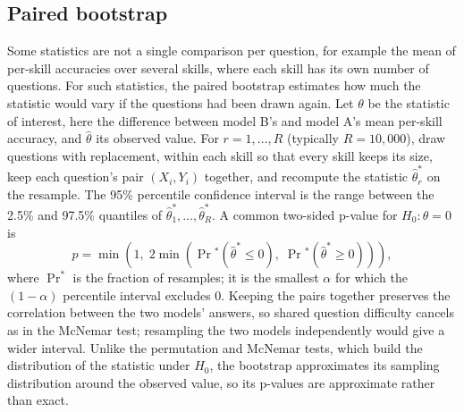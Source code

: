 \subsection*{Paired bootstrap}
Some statistics are not a single comparison per question, for example the mean of per-skill accuracies over several skills, where each skill has its own number of questions.
For such statistics, the paired bootstrap estimates how much the statistic would vary if the questions had been drawn again.
Let \(\theta\) be the statistic of interest, here the difference between model B's and model A's mean per-skill accuracy, and \(\hat\theta\) its observed value.
For \(r = 1, \ldots, R\) (typically \(R = 10{,}000\)), draw questions with replacement, within each skill so that every skill keeps its size, keep each question's pair \((X_i, Y_i)\) together, and recompute the statistic \(\hat\theta^*_r\) on the resample.
The 95\% percentile confidence interval is the range between the 2.5\% and 97.5\% quantiles of \(\hat\theta^*_1, \ldots, \hat\theta^*_R\).
A common two-sided p-value for \(H_0: \theta = 0\) is
\[
p = \min\left(1,\; 2\min\left(\Pr{}^*(\hat\theta^* \le 0),\; \Pr{}^*(\hat\theta^* \ge 0)\right)\right),
\]
where \(\Pr^*\) is the fraction of resamples; it is the smallest \(\alpha\) for which the \((1-\alpha)\) percentile interval excludes 0.
Keeping the pairs together preserves the correlation between the two models' answers, so shared question difficulty cancels as in the McNemar test; resampling the two models independently would give a wider interval.
Unlike the permutation and McNemar tests, which build the distribution of the statistic under \(H_0\), the bootstrap approximates its sampling distribution around the observed value, so its p-values are approximate rather than exact.

